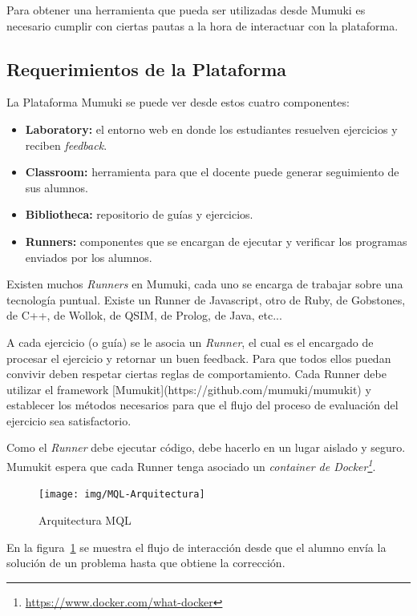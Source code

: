 
Para obtener una herramienta que pueda ser utilizadas desde
Mumuki es necesario cumplir con ciertas pautas a la hora
de interactuar con la plataforma.

\subsection{Requerimientos de la Plataforma}

La Plataforma Mumuki se puede ver desde estos cuatro componentes:

\begin{itemize}
    \item \textbf{Laboratory:} el entorno web en donde los estudiantes resuelven ejercicios y reciben \textit{feedback}.
    \item \textbf{Classroom:} herramienta para que el docente puede generar seguimiento de sus alumnos.
    \item \textbf{Bibliotheca:} repositorio de guías y ejercicios.
    \item \textbf{Runners:} componentes que se encargan de ejecutar y verificar los programas enviados por los alumnos.
\end{itemize}

Existen muchos \textit{Runners} en Mumuki, cada uno se encarga
de trabajar sobre una tecnología puntual.
Existe un Runner de Javascript, otro de Ruby, de Gobstones, de C++, de Wollok,
de QSIM, de Prolog, de Java, etc...

A cada ejercicio (o guía) se le asocia un \textit{Runner},
el cual es el encargado de procesar el ejercicio y retornar
un buen feedback. Para que todos ellos puedan convivir deben
respetar ciertas reglas de comportamiento.
Cada Runner debe utilizar el framework [Mumukit](https://github.com/mumuki/mumukit)
y establecer los métodos necesarios para que el flujo del proceso de
evaluación del ejercicio sea satisfactorio.

Como el \textit{Runner} debe ejecutar código, debe hacerlo en
un lugar aislado y seguro. Mumukit espera que cada Runner
tenga asociado un \textit{container de Docker\footnote{\url{https://www.docker.com/what-docker}}}.


\begin{figure}[h]
  \centering
  \texttt{[image: img/MQL-Arquitectura]}
  \caption{Arquitectura MQL}
  \label{fig:arquitectura}
\end{figure}

En la figura~\ref{fig:arquitectura} se muestra el flujo de interacción
desde que el alumno envía la solución de un problema hasta que obtiene
la corrección.

